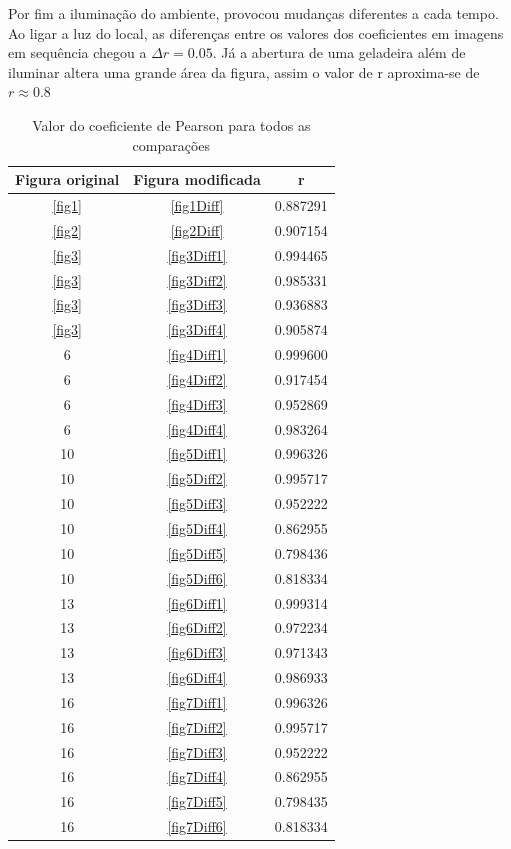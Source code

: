 \documentclass[10pt,a4paper]{article}
\begin{document}
Por fim a iluminação do ambiente, provocou mudanças diferentes a cada
tempo. Ao ligar a luz do local, as diferenças entre os valores dos
coeficientes em imagens em sequência chegou a $\Delta r=0.05 $. Já a
abertura de uma geladeira além de iluminar altera uma grande área da
figura, assim o valor de r aproxima-se de $r\approx 0.8$

\begin{table}[h!]
  \begin{center}
    \caption{Valor do coeficiente de Pearson para todos as comparações}
    \begin{tabular}{|c|c|c|}
      \hline
      Figura original & Figura modificada & r\\
      \hline
      \ref{fig1} &  \ref{fig1Diff} &  0.887291 \\
      \ref{fig2} &  \ref{fig2Diff} &  0.907154\\
      \ref{fig3} &  \ref{fig3Diff1} & 0.994465\\
      \ref{fig3} & \ref{fig3Diff2} &  0.985331\\
      \ref{fig3} &  \ref{fig3Diff3} &  0.936883\\
      \ref{fig3} &  \ref{fig3Diff4} &  0.905874\\
      6 &  \ref{fig4Diff1} & 0.999600\\
      6 &  \ref{fig4Diff2} &  0.917454\\
      6 &  \ref{fig4Diff3} &   0.952869\\
      6 &  \ref{fig4Diff4} &   0.983264\\
      10 &  \ref{fig5Diff1} & 0.996326\\
      10 &  \ref{fig5Diff2} & 0.995717\\
      10 &  \ref{fig5Diff3} & 0.952222\\
      10 &  \ref{fig5Diff4} & 0.862955\\
      10 &  \ref{fig5Diff5} & 0.798436\\
      10 &  \ref{fig5Diff6} & 0.818334\\
      13 &  \ref{fig6Diff1} & 0.999314\\
      13 &  \ref{fig6Diff2} & 0.972234\\
      13 &  \ref{fig6Diff3} & 0.971343\\
      13 &  \ref{fig6Diff4} & 0.986933\\
      16 &  \ref{fig7Diff1} & 0.996326\\
      16 &  \ref{fig7Diff2} & 0.995717\\
      16 &  \ref{fig7Diff3} & 0.952222\\
      16 &  \ref{fig7Diff4} & 0.862955\\
      16 &  \ref{fig7Diff5} & 0.798435\\
      16 &  \ref{fig7Diff6} &  0.818334\\
      \hline
    \end{tabular}
  \end{center}\label{tab:final}
\end{table}
\end{document}
